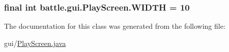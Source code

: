 \subsubsection[{W\+I\+D\+T\+H}]{\setlength{\rightskip}{0pt plus 5cm}final int battle.\+gui.\+Play\+Screen.\+W\+I\+D\+T\+H = 10\hspace{0.3cm}{\ttfamily [static]}}\label{classbattle_1_1gui_1_1_play_screen_a668a4bdf7c3ca151b1b54209d1c6574c}


The documentation for this class was generated from the following file\+:\begin{DoxyCompactItemize}
\item 
gui/\hyperlink{_play_screen_8java}{Play\+Screen.\+java}\end{DoxyCompactItemize}
